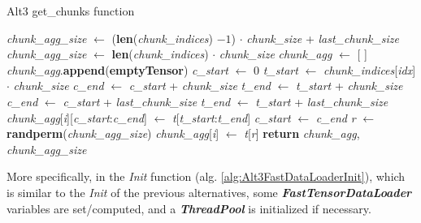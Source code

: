 \documentclass[pdfa%
,cucitura%
]{toptesi}
\begin{document}
\begin{algorithm}[h!]
	\caption{Alt3 get\_chunks function}\label{alg:Alt3GetChunks}
	\begin{algorithmic}[1]
		\State \textit{chunk\_agg\_size} $\gets$ (\textbf{len}(\textit{chunk\_indices}) $- 1$) $\cdot$ \textit{chunk\_size} + \textit{last\_chunk\_size}
		\Else
		\State \textit{chunk\_agg\_size} $\gets$ \textbf{len}(\textit{chunk\_indices}) $\cdot$ \textit{chunk\_size}
		\EndIf
		\State
		\State \textit{chunk\_agg} $\gets$ [ ]
		\State \textit{chunk\_agg}.\textbf{append}(\textbf{emptyTensor})
		\EndFor
		\State
		\State \textit{c\_start} $\gets$ 0
		\State \textit{t\_start} $\gets$ \textit{chunk\_indices}[\textit{idx}] $\cdot$ \textit{chunk\_size}
		\State \textit{c\_end} $\gets$ \textit{c\_start} + \textit{chunk\_size}
		\State \textit{t\_end} $\gets$ \textit{t\_start} + \textit{chunk\_size}
		\Else
		\State \textit{c\_end} $\gets$ \textit{c\_start} + \textit{last\_chunk\_size}
		\State \textit{t\_end} $\gets$ \textit{t\_start} + \textit{last\_chunk\_size}
		\EndIf
		\State
		\State \textit{chunk\_agg}[\textit{i}][\textit{c\_start}:\textit{c\_end}] $\gets$ \textit{t}[\textit{t\_start}:\textit{t\_end}]
		\EndFor
		\State \textit{c\_start} $\gets$ \textit{c\_end}
		\EndFor
		\State
		\State \textit{r} $\gets$ \textbf{randperm}(\textit{chunk\_agg\_size})
		\State \textit{chunk\_agg}[\textit{i}] $\gets$ \textit{t}[\textit{r}]
		\EndFor
		\EndIf
		\State
		\State \textbf{return} \textit{chunk\_agg}, \textit{chunk\_agg\_size}
		\EndFunction
	\end{algorithmic}
\end{algorithm}

More specifically, in the \textit{Init} function (alg. \ref{alg:Alt3FastDataLoaderInit}), which is similar to the \textit{Init} of the previous alternatives, some \textit{\textbf{FastTensorDataLoader}} variables are set/computed, and a \textit{\textbf{ThreadPool}} is initialized if necessary.
\end{document}
